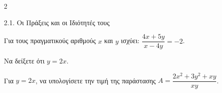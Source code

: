 \begin{ylh}{2}
    \item 2.1. Οι Πράξεις και οι Ιδιότητές τους
\end{ylh}
Για τους πραγματικούς αριθμούς $x$ και $y$ ισχύει: $\dfrac{4x+5y}{x-4y} = -2$.
\begin{alist}
\item Να δείξετε ότι $y = 2x$. 
\item Για $y = 2x$, να υπολογίσετε την τιμή της παράστασης $A = \dfrac{2x^2+3y^2+xy}{xy}$. 
\end{alist}

